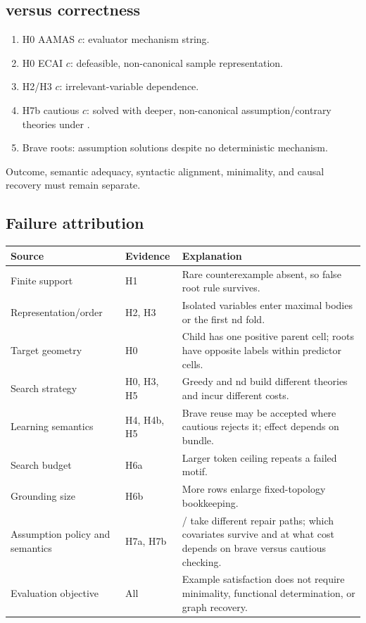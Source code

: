 \documentclass[11pt]{article}
\DeclareRobustCommand{\code}[1]{\texttt{\detokenize{#1}}}
\begin{document}
\subsection{\code{solved} versus correctness}

\begin{enumerate}
  \item H0 AAMAS \(c\): evaluator mechanism string.
  \item H0 ECAI \(c\): defeasible, non-canonical sample representation.
  \item H2/H3 \(c\): irrelevant-variable dependence.
  \item H7b cautious \(c\): solved with deeper, non-canonical
  assumption/contrary theories under \code{sechk}.
  \item Brave roots: assumption solutions despite no deterministic mechanism.
\end{enumerate}
Outcome, semantic adequacy, syntactic alignment, minimality, and causal
recovery must remain separate.

\subsection{Failure attribution}

\begin{center}
\begin{tabularx}{\textwidth}{
  >{\raggedright\arraybackslash}p{}
  >{\raggedright\arraybackslash}p{}X}
\toprule
Source & Evidence & Explanation \\
\midrule
Finite support & H1 & Rare counterexample absent, so false root rule survives. \\
Representation/order & H2, H3 & Isolated variables enter maximal bodies or
the first nd fold. \\
Target geometry & H0 & Child has one positive parent cell; roots have
opposite labels within predictor cells. \\
Search strategy & H0, H3, H5 & Greedy and nd build different theories and
incur different costs. \\
Learning semantics & H4, H4b, H5 & Brave reuse may be accepted where cautious
rejects it; effect depends on bundle. \\
Search budget & H6a & Larger token ceiling repeats a failed motif. \\
Grounding size & H6b & More rows enlarge fixed-topology bookkeeping. \\
Assumption policy and semantics & H7a, H7b & \code{relto}/\code{sechk} take
different repair paths; which covariates survive and at what cost depends on
brave versus cautious checking. \\
Evaluation objective & All & Example satisfaction does not require minimality,
functional determination, or graph recovery. \\
\bottomrule
\end{tabularx}
\end{center}
\end{document}
